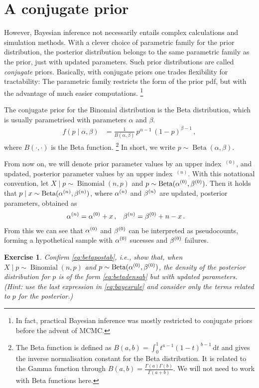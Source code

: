 \documentclass[12pt,a4paper	,twoside]{article}
\newcommand{\dd}{\,\mathrm{d}}
\newcommand{\uz}{^{(0)}} %
\newcommand{\un}{^{(n)}} %
\newcommand{\bin}{\operatorname{Binomial}}
\newcommand{\be}{\operatorname{Beta}}
\newtheorem{myex}{Exercise}
\begin{document}
\section{A conjugate prior}

However, Bayesian inference not necessarily entails complex calculations and simulation methods.
With a clever choice of parametric family for the prior distribution,
the posterior distribution belongs to the same parametric family as the prior,
just with updated parameters.
Such prior distributions are called \emph{conjugate} priors.
Basically, with conjugate priors one trades flexibility for tractability:
The parametric family restricts the form of the prior pdf,
but with the advantage of much easier computations.%
\footnote{In fact, practical Bayesian inference was mostly restricted to conjugate priors before the advent of MCMC.}

The conjugate prior for the Binomial distribution is the Beta distribution,
which is usually parametrised with parameters $\alpha$ and $\beta$.
\begin{align}
f(p\mid\alpha,\beta) &= \frac{1}{B(\alpha,\beta)}\, p^{\alpha-1}\, (1-p)^{\beta-1}\,,
\label{eq:betadensab}
\end{align}
where $B(\cdot,\cdot)$ is the Beta function.%
\footnote{The Beta function is defined as $B(a,b) = \int_0^1 t^{a-1} (1-t)^{b-1} \dd t$
and gives the inverse normalisation constant for the Beta distribution.
It is related to the Gamma function through $B(a,b) = \frac{\Gamma(a)\Gamma(b)}{\Gamma(a+b)}$.
We will not need to work with Beta functions here.}
In short, we write $p \sim \be(\alpha,\beta)$.

From now on, we will denote prior parameter values by an upper index~${}\uz$,
and updated, posterior parameter values by an upper index~${}\un$.
With this notational convention,
let $X\mid p \sim \bin(n,p)$ and $p \sim \be(\az,\bz)$.
Then it holds that $p \mid x \sim \be(\an,\bn)$,
where $\an$ and $\bn$ are updated, posterior parameters, obtained as
\begin{align}
\an &= \az + x\,, & \bn &= \bz + n - x \,.
\label{eq:betapostab}
\end{align}
From this we can see that $\az$ and $\bz$ can be interpreted as pseudocounts,
forming a hypothetical sample with $\az$ sucesses and $\bz$ failures.
\begin{myex}
Confirm \eqref{eq:betapostab}, i.e.,
show that, when $X\mid p \sim \bin(n,p)$ and $p \sim \be(\az,\bz)$,
the density of the posterior distribution for $p$ is of the form \eqref{eq:betadensab}
but with updated parameters.
(Hint: use the last expression in \eqref{eq:bayesrule}
and consider only the terms related to $p$ for the posterior.)
\end{myex}
\end{document}
